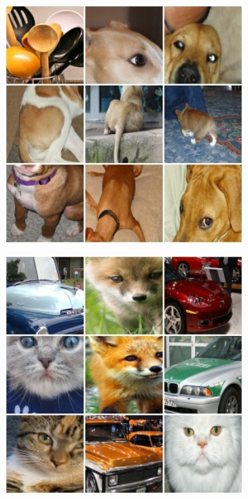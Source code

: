 \begin{figure}[!htb]
\begin{center}
\begin{subfigure}[h]{0.23\textwidth}
		\end{subfigure}
		\hfill
		\begin{subfigure}[h]{0.23\textwidth}
			\centering
			\includegraphics[width=1\textwidth]{"contents/images/02-feature-dog-1"}
		\end{subfigure}
		\hfill
		\begin{subfigure}[h]{0.23\textwidth}
			\centering
			\includegraphics[width=1\textwidth]{"contents/images/02-feature-cat-1"}

\end{subfigure}
\end{center}
\end{figure}
